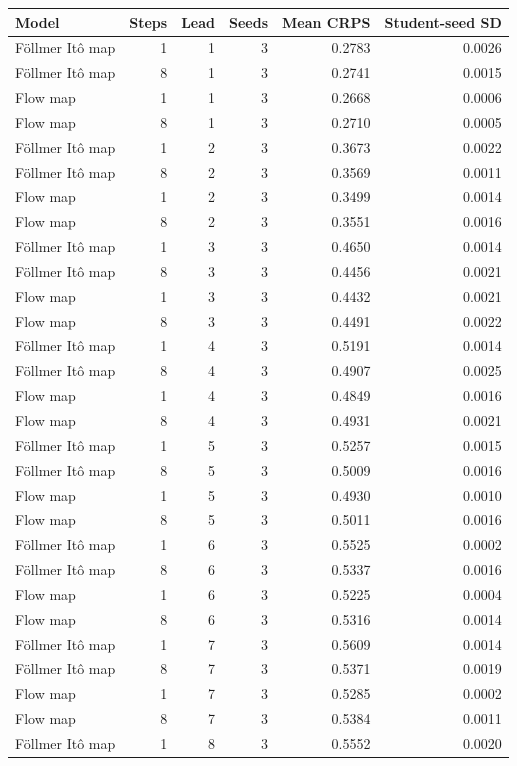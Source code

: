 \begin{tabular}{lrrrrr}
\toprule
Model & Steps & Lead & Seeds & Mean CRPS & Student-seed SD \\
\midrule
Föllmer Itô map & 1 & 1 & 3 & 0.2783 & 0.0026 \\
Föllmer Itô map & 8 & 1 & 3 & 0.2741 & 0.0015 \\
Flow map & 1 & 1 & 3 & 0.2668 & 0.0006 \\
Flow map & 8 & 1 & 3 & 0.2710 & 0.0005 \\
Föllmer Itô map & 1 & 2 & 3 & 0.3673 & 0.0022 \\
Föllmer Itô map & 8 & 2 & 3 & 0.3569 & 0.0011 \\
Flow map & 1 & 2 & 3 & 0.3499 & 0.0014 \\
Flow map & 8 & 2 & 3 & 0.3551 & 0.0016 \\
Föllmer Itô map & 1 & 3 & 3 & 0.4650 & 0.0014 \\
Föllmer Itô map & 8 & 3 & 3 & 0.4456 & 0.0021 \\
Flow map & 1 & 3 & 3 & 0.4432 & 0.0021 \\
Flow map & 8 & 3 & 3 & 0.4491 & 0.0022 \\
Föllmer Itô map & 1 & 4 & 3 & 0.5191 & 0.0014 \\
Föllmer Itô map & 8 & 4 & 3 & 0.4907 & 0.0025 \\
Flow map & 1 & 4 & 3 & 0.4849 & 0.0016 \\
Flow map & 8 & 4 & 3 & 0.4931 & 0.0021 \\
Föllmer Itô map & 1 & 5 & 3 & 0.5257 & 0.0015 \\
Föllmer Itô map & 8 & 5 & 3 & 0.5009 & 0.0016 \\
Flow map & 1 & 5 & 3 & 0.4930 & 0.0010 \\
Flow map & 8 & 5 & 3 & 0.5011 & 0.0016 \\
Föllmer Itô map & 1 & 6 & 3 & 0.5525 & 0.0002 \\
Föllmer Itô map & 8 & 6 & 3 & 0.5337 & 0.0016 \\
Flow map & 1 & 6 & 3 & 0.5225 & 0.0004 \\
Flow map & 8 & 6 & 3 & 0.5316 & 0.0014 \\
Föllmer Itô map & 1 & 7 & 3 & 0.5609 & 0.0014 \\
Föllmer Itô map & 8 & 7 & 3 & 0.5371 & 0.0019 \\
Flow map & 1 & 7 & 3 & 0.5285 & 0.0002 \\
Flow map & 8 & 7 & 3 & 0.5384 & 0.0011 \\
Föllmer Itô map & 1 & 8 & 3 & 0.5552 & 0.0020 \\

\end{tabular}
